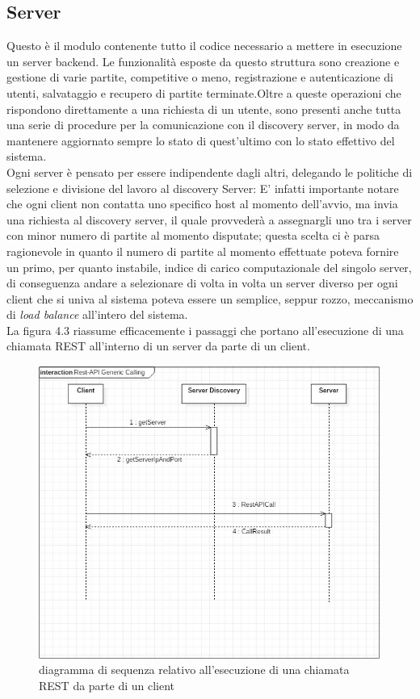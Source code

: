  \subsection {Server}\label{subsec:details:server}
 Questo è il modulo contenente tutto il codice necessario a mettere in esecuzione un server backend. Le funzionalità esposte da questo struttura sono creazione e gestione di varie partite, competitive o meno, registrazione e autenticazione di utenti, salvataggio e recupero di partite terminate.Oltre a queste operazioni che rispondono direttamente a una richiesta di un utente, sono presenti anche tutta una serie di procedure per la comunicazione con il discovery server, in modo da mantenere aggiornato sempre lo stato di quest'ultimo con lo stato effettivo del sistema.\\
 Ogni server è pensato per essere indipendente dagli altri, delegando le politiche di selezione e divisione del lavoro al discovery Server:
 E' infatti importante notare che ogni client non contatta uno specifico host al momento dell'avvio, ma invia una richiesta al discovery server, il quale provvederà a assegnargli uno tra i server con minor numero di partite al momento disputate; questa scelta ci è parsa ragionevole in quanto il numero di partite al momento effettuate poteva fornire un primo, per quanto instabile, indice di carico computazionale del singolo server, di conseguenza andare a selezionare di volta in volta un server diverso per ogni client che si univa al sistema poteva essere un semplice, seppur rozzo, meccanismo di \textit{load balance} all'intero del sistema.\\
 La figura 4.3 riassume efficacemente i passaggi che portano all'esecuzione di una chiamata REST all'interno di un server da parte di un client.\\

 \begin{figure}[htbp]
   \includegraphics[width=\textwidth,height=\textheight,keepaspectratio]{restAPICall}
    \caption{diagramma di sequenza relativo all'esecuzione di una chiamata REST da parte di un client}
 \end{figure}


